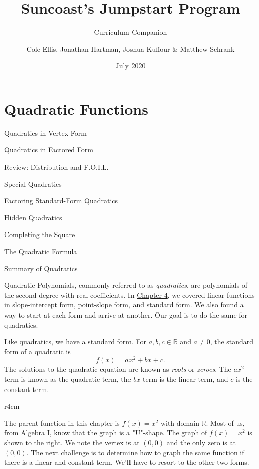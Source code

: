 \documentclass[lang=en,11pt]{elegantbook}
\title{Suncoast's Jumpstart Program}
\subtitle{Curriculum Companion}
\author{Cole Ellis, Jonathan Hartman, Joshua Kuffour \& Matthew Schrank}
\institute{Suncoast High School}
\date{July 2020}
\begin{document}
\maketitle

\frontmatter
\tableofcontents

\mainmatter





\chapter{Quadratic Functions}
\begin{introduction}[Contents]
\item Quadratics in Vertex Form
\item Quadratics in Factored Form
\item Review: Distribution and F.O.I.L.
\item Special Quadratics
\item Factoring Standard-Form Quadratics
\item Hidden Quadratics
\item Completing the Square
\item The Quadratic Formula
\item Summary of Quadratics
\end{introduction}
\noindent Quadratic Polynomials, commonly referred to as \textit{quadratics}, are polynomials of the second-degree with real coefficients.  In \hyperlink{chapter.4}{Chapter 4}, we covered linear functions in slope-intercept form, point-slope form, and standard form.  We also found a way to start at each form and arrive at another.  Our goal is to do the same for quadratics.

Like quadratics, we have a standard form.  For $a,b,c\in\mathbb{R}$ and $a\neq 0$, the standard form of a quadratic is $$f(x)=ax^2+bx+c.$$  The solutions to the quadratic equation are known as \textit{roots} or \textit{zeroes}.  The $ax^2$ term is known as the quadratic term, the $bx$ term is the linear term, and $c$ is the constant term.
\begin{wrapfigure}{r}{4cm}
\end{wrapfigure}
The parent function in this chapter is $f(x)=x^2$ with domain $\mathbb{R}$.  Most of us, from Algebra I, know that the graph is a "U"-shape.  The graph of $f(x)=x^2$ is shown to the right.  We note the vertex is at $(0,0)$ and the only zero is at $(0,0)$.  The next challenge is to determine how to graph the same function if there is a linear and constant term.  We'll have to resort to the other two forms.
\end{document}

